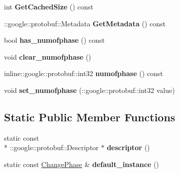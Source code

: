 \begin{DoxyCompactItemize}
\item 
\hypertarget{class_change_phase_a061c6426b4e079d7fe6ade662e3fcb60}{int {\bfseries Get\-Cached\-Size} () const }\label{class_change_phase_a061c6426b4e079d7fe6ade662e3fcb60}

\item 
\hypertarget{class_change_phase_adf1e1f91fda84e9fcbc64a32d0442ee8}{\-::google\-::protobuf\-::\-Metadata {\bfseries Get\-Metadata} () const }\label{class_change_phase_adf1e1f91fda84e9fcbc64a32d0442ee8}

\item 
\hypertarget{class_change_phase_aebfe231080875edab422c1332fb9848c}{bool {\bfseries has\-\_\-numofphase} () const }\label{class_change_phase_aebfe231080875edab422c1332fb9848c}

\item 
\hypertarget{class_change_phase_ad0d17253d8988af5afa6f3b81235164e}{void {\bfseries clear\-\_\-numofphase} ()}\label{class_change_phase_ad0d17253d8988af5afa6f3b81235164e}

\item 
\hypertarget{class_change_phase_a00b30bc0d542ab389b7b20aaae1b10bc}{inline\-::google\-::protobuf\-::int32 {\bfseries numofphase} () const }\label{class_change_phase_a00b30bc0d542ab389b7b20aaae1b10bc}

\item 
\hypertarget{class_change_phase_a40d66346dfc6aae8de80fb5545fe8460}{void {\bfseries set\-\_\-numofphase} (\-::google\-::protobuf\-::int32 value)}\label{class_change_phase_a40d66346dfc6aae8de80fb5545fe8460}

\end{DoxyCompactItemize}
\subsection*{Static Public Member Functions}
\begin{DoxyCompactItemize}
\item 
\hypertarget{class_change_phase_abc14333ee6f01fd88840e430c202f926}{static const \\*
\-::google\-::protobuf\-::\-Descriptor $\ast$ {\bfseries descriptor} ()}\label{class_change_phase_abc14333ee6f01fd88840e430c202f926}

\item 
\hypertarget{class_change_phase_a2a86feb8760cbad6c536e5f836ba6755}{static const \hyperlink{class_change_phase}{Change\-Phase} \& {\bfseries default\-\_\-instance} ()}\label{class_change_phase_a2a86feb8760cbad6c536e5f836ba6755}

\end{DoxyCompactItemize}

